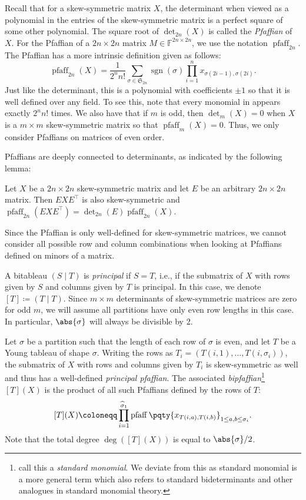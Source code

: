 \documentclass[10pt,a4paper]{amsart}
\newcommand*\ie{i.e.}
\DeclareMathOperator{\pfaff}{pfaff}
\DeclareMathOperator{\sgn}{sgn}
\newcommand*\F{\mathbb{F}}
\newcommand*\defeq{\coloneqq}
\begin{document}
Recall that for a skew-symmetric matrix $X$, the determinant when viewed as a polynomial in the entries of the skew-symmetric matrix is a perfect square of some other polynomial.
The square root of $\det_{2n}(X)$ is called the \emph{Pfaffian} of $X$.
For the Pfaffian of a $2n \times 2n$ matrix $M \in \F^{2n \times 2n}$, we use the notation $\pfaff_{2n}$.
The Pfaffian has a more intrinsic definition given as follows:
\begin{equation}\label{eq:pfaff_defn}
    \pfaff_{2n}(X) = \frac{1}{2^n n!} \sum_{\sigma \in \mathfrak{S}_{2n}} \sgn(\sigma) \prod_{i = 1}^n x_{\sigma(2i - 1), \sigma(2i)}.
\end{equation}
Just like the determinant, this is a polynomial with coefficients $\pm 1$ so that it is well defined over any field.
To see this, note that every monomial in  appears exactly $2^n n!$ times.
We also have that if $m$ is odd, then $\det_m(X) = 0$ when $X$ is a $m \times m$ skew-symmetric matrix so that $\pfaff_m(X) = 0$.
Thus, we only consider Pfaffians on matrices of even order.

Pfaffians are deeply connected to determinants, as indicated by the following lemma:
\begin{lem}[{\cite[Lemma 2.27]{AF21}}]\label{lem:pfaff_conj}
    Let $X$ be a $2n \times 2n$ skew-symmetric matrix and let $E$ be an arbitrary $2n \times 2n$ matrix.
    Then $EXE^\top$ is also skew-symmetric and $\pfaff_{2n}(EXE^\top) = \det_{2n}(E) \pfaff_{2n}(X)$.
\end{lem}

Since the Pfaffian is only well-defined for skew-symmetric matrices, we cannot consider all possible row and column combinations when looking at Pfaffians defined on minors of a matrix.
\begin{defn}\label{defn:principal_bitableau}
    A bitableau $(S \mid T)$ is \emph{principal} if $S = T$, \ie, if the submatrix of $X$ with rows given by $S$ and columns given by $T$ is principal.
    In this case, we denote $[T] \defeq (T \mid T)$.
    Since $m \times m$ determinants of skew-symmetric matrices are zero for odd $m$, we will assume all partitions have only even row lengths in this case.
    In particular, $\abs{\sigma}$ will always be divisible by $2$.
    
    Let $\sigma$ be a partition such that the length of each row of $\sigma$ is even, and let $T$ be a Young tableau of shape $\sigma$.
    Writing the rows as $T_i = (T(i, 1), \ldots, T(i, \sigma_i))$, the submatrix of $X$ with rows and columns given by $T_i$ is skew-symmetric as well and thus has a well-defined \emph{principal pfaffian}.
    The associated \emph{bipfaffian}\footnote{\cite{AF21} call this a \emph{standard monomial}.
    We deviate from this as standard monomial is a more general term which also refers to standard bideterminants and other analogues in standard monomial theory.} $[T](X)$ is the product of all such Pfaffians defined by the rows of $T$: 
    \[
        [T](X) \defeq \prod_{i = 1}^{\widehat{\sigma}_1} \pfaff\pqty{x_{T(i, a), T(i, b)}}_{1 \leq a, b \leq \sigma_i}.
    \]
    Note that the total degree $\deg([T](X))$ is equal to $\abs{\sigma} / 2$.
\end{defn}
\end{document}
